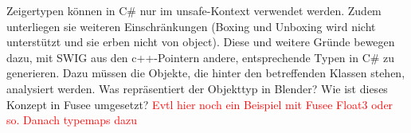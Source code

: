 Zeigertypen können in C\# nur im unsafe-Kontext verwendet werden. Zudem unterliegen sie weiteren Einschränkungen (Boxing und Unboxing wird nicht unterstützt und sie erben nicht von object). Diese und weitere Gründe bewegen dazu, mit SWIG aus den c++-Pointern andere, entsprechende Typen in C\# zu generieren. Dazu müssen die Objekte, die hinter den betreffenden Klassen stehen, analysiert werden. Was repräsentiert der Objekttyp in Blender? Wie ist dieses Konzept in Fusee umgesetzt? \textcolor{red}{Evtl hier noch ein Beispiel mit Fusee Float3 oder so. Danach typemaps dazu}
